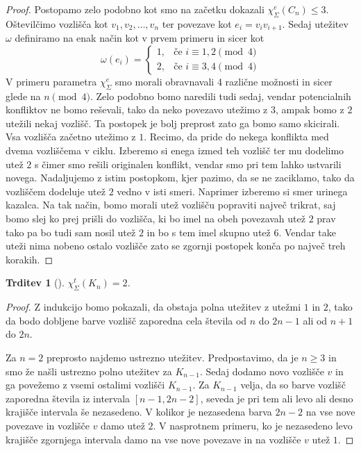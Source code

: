 \documentclass[12pt,a4paper,twoside]{article}
\theoremstyle{definition} %
\theoremstyle{plain} %
\newtheorem{trditev}[definicija]{Trditev}
\newcommand{\ec}{\chi_{\Sigma}^e}
\newcommand{\ect}{\chi_{\Sigma}^t}
\numberwithin{equation}{section}  %
\begin{document}
\begin{proof}
Postopamo zelo podobno kot smo na začetku dokazali $\ec(C_n) \le 3$. Oštevilčimo vozlišča kot $v_1, v_2, \ldots, v_n$ ter povezave kot $e_i = v_iv_{i+1}$. Sedaj utežitev $\omega$ definiramo na enak način kot v prvem primeru in sicer kot
\begin{equation*}
	\omega(e_i) = \begin{cases}
	1, & \text{če } i \equiv 1,2 \pmod{4}\\ 
	2, &\text{če } i \equiv 3,4 \pmod{4}
	\end{cases}
	\end{equation*}
V primeru parametra $\ec$ smo morali obravnavali 4 različne možnosti in sicer glede na $ n \pmod{4}$. Zelo podobno bomo naredili tudi sedaj, vendar potencialnih konfliktov ne bomo reševali, tako da neko povezavo utežimo z $3$, ampak bomo z $2$ utežili nekaj vozlišč. Ta postopek je bolj preprost zato ga bomo samo skicirali. Vsa vozlišča začetno utežimo z $1$. Recimo, da pride do nekega konflikta med dvema vozliščema v ciklu. Izberemo si enega izmed teh vozlišč ter mu dodelimo utež $2$ s čimer smo rešili originalen konflikt, vendar smo pri tem lahko ustvarili novega. Nadaljujemo z istim postopkom, kjer pazimo, da se ne zaciklamo, tako da vozliščem dodeluje utež $2$ vedno v isti smeri. Naprimer izberemo si smer urinega kazalca. Na tak način, bomo morali utež vozlišču popraviti največ trikrat, saj bomo slej ko prej prišli do vozlišča, ki bo imel na obeh povezavah utež $2$ prav tako pa bo tudi sam nosil utež $2$ in bo s tem imel skupno utež $6$. Vendar take uteži nima nobeno ostalo vozlišče zato se zgornji postopek konča po največ treh korakih.
\end{proof}

\begin{trditev}[\citet{12conj}]
$\ect(K_n) = 2$.
\end{trditev}

\begin{proof}
Z indukcijo bomo pokazali, da obstaja polna utežitev z utežmi $1$ in $2$, tako da bodo dobljene barve vozlišč zaporedna cela števila od $n$ do $2n - 1$ ali od $n+1$ do $2n$. 

Za $n=2$ preprosto najdemo ustrezno utežitev. Predpostavimo, da je $n \ge 3$ in smo že našli ustrezno polno utežitev za $K_{n-1}$. Sedaj dodamo novo vozlišče $v$ in ga povežemo z vsemi ostalimi vozlišči $K_{n-1}$. Za $K_{n-1}$ velja, da so barve vozlišč zaporedna števila iz intervala $[n-1, 2n - 2]$, seveda je pri tem ali levo ali desno krajišče intervala še nezasedeno. V kolikor je nezasedena barva $2n - 2$ na vse nove povezave in vozlišče $v$ damo utež $2$. V nasprotnem primeru, ko je nezasedeno levo krajišče zgornjega intervala damo na vse nove povezave in na vozlišče $v$ utež $1$.
\end{proof}
\end{document}
